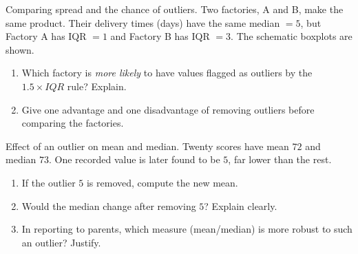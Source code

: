 \documentclass[11pt]{article}
\def\textbf#1{#1}%
\def\mathrm#1{#1}%
\newcounter{question}
\begin{document}
\begin{question}
\textbf{Comparing spread and the chance of outliers.}
Two factories, A and B, make the same product. Their delivery times (days) have the same median $= 5$,  
but Factory A has IQR $=1$ and Factory B has IQR $=3$. The schematic boxplots are shown.

\begin{center}
\end{center}

\begin{enumerate}
  \item Which factory is \emph{more likely} to have values flagged as outliers by the $1.5\times\mathrm{IQR}$ rule? Explain.
  \item Give one advantage and one disadvantage of removing outliers before comparing the factories.
\end{enumerate}
\end{question}


\begin{question}
\textbf{Effect of an outlier on mean and median.}
Twenty scores have mean $72$ and median $73$. One recorded value is later found to be $5$, far lower than the rest.
\begin{enumerate}
  \item If the outlier $5$ is removed, compute the new mean.
  \item Would the median change after removing $5$? Explain clearly.
  \item In reporting to parents, which measure (mean/median) is more robust to such an outlier? Justify.
\end{enumerate}
\end{question}
\end{document}
